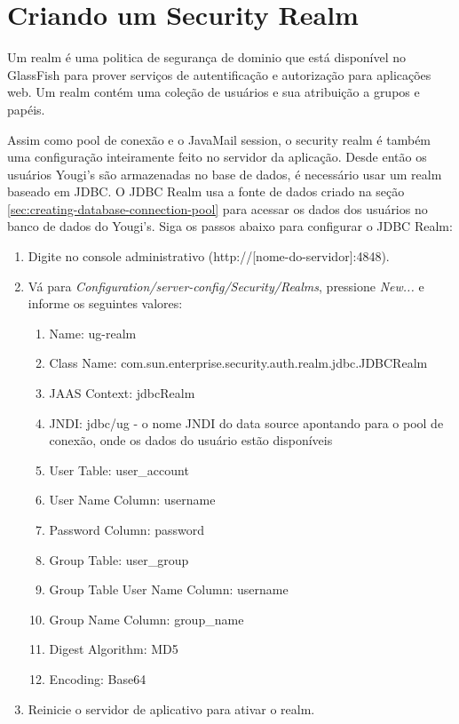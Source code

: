 \documentclass[envcountsame,envcountchap]{svmono}
\begin{document}
\section{Criando um Security Realm}

Um realm é uma politica de segurança de dominio que está disponível no GlassFish para prover serviços de autentificação e autorização para aplicações web. Um realm contém uma coleção de usuários e sua atribuição a grupos e papéis.

Assim como pool de conexão e o JavaMail session, o security realm é também uma configuração inteiramente feito no servidor da aplicação. Desde então os usuários Yougi's são armazenadas no base de dados, é necessário usar um realm baseado em JDBC. O JDBC Realm usa a fonte de dados criado na seção \ref{sec:creating-database-connection-pool} para acessar os dados dos usuários no banco de dados do Yougi's. Siga os passos abaixo para configurar o JDBC Realm:

\begin{enumerate}
\item Digite no console administrativo (http://[nome-do-servidor]:4848).
\item Vá para \textit{Configuration/server-config/Security/Realms}, pressione \textit{New...} e informe os seguintes valores:
   \begin{enumerate}
   \item Name: ug-realm
   \item Class Name: com.sun.enterprise.security.auth.realm.jdbc.JDBCRealm
   \item JAAS Context: jdbcRealm
   \item JNDI: jdbc/ug - o nome JNDI do data source apontando para o pool de conexão, onde os dados do usuário estão disponíveis
   \item User Table: user\_account
   \item User Name Column: username
   \item Password Column: password
   \item Group Table: user\_group
   \item Group Table User Name Column: username
   \item Group Name Column: group\_name
   \item Digest Algorithm: MD5
   \item Encoding: Base64
   \end{enumerate}
\item Reinicie o servidor de aplicativo para ativar o realm.
\end{enumerate}
\end{document}
